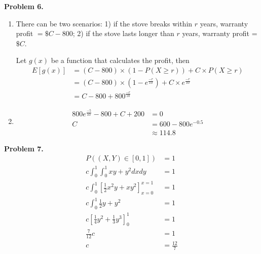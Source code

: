 \documentclass{article}
\begin{document}
\textbf{Problem 6.}
\begin{enumerate}[label={(\alph*)}]
    \item There can be two scenarios: 1) if the stove breaks within $r$ years, warranty profit $ = \$C-800$; 2) if the stove lasts longer than $r$ years, warranty profit = $\$C$.
    
    Let $g(x)$ be a function that calculates the profit, then 
    \begin{align}
        E[g(x)] & = (C-800) \times \left(1-P(X \ge r)\right)+C\times P(X\ge r) \\
        & = (C-800) \times (1 - e^{\frac{-r}{10}})+C\times e^{\frac{-r}{10}} \\
        & = C-800+800^{\frac{-r}{10}}
    \end{align}

    \item 
    \begin{align}
        800e^{\frac{-5}{10}}-800+C+200 & = 0 \\
        C & = 600 - 800e^{-0.5} \\
        & \approx 114.8
    \end{align}
\end{enumerate}
\bigbreak

\textbf{Problem 7.}
\begin{align}
    P((X,Y)\in [0,1])&=1 \\
    c\int_{0}^{1}\int_{0}^{1}xy+y^2dxdy & = 1 \\
    c\int_{0}^{1}\left[\frac{1}{2}x^2y+xy^2\right]_{x=0}^{x=1} & = 1 \\
    c\int_{0}^{1}\frac{1}{2}y+y^2& = 1 \\
    c\left[\frac{1}{4}y^2+\frac{1}{3}y^3\right]_0^1 & = 1 \\
    \frac{7}{12}c & = 1 \\
    c & = \frac{12}{7}
\end{align}
\end{document}
